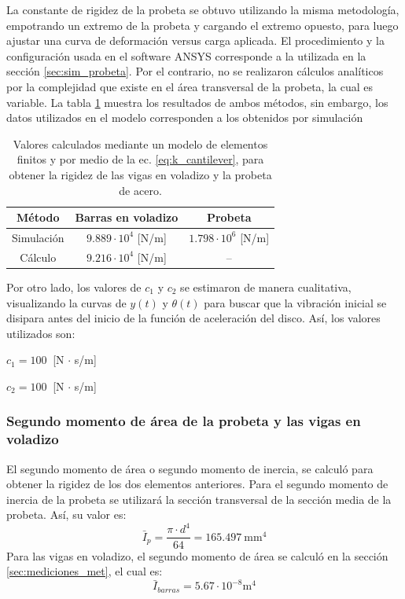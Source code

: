 La constante de rigidez de la probeta se obtuvo utilizando la misma metodología, empotrando un extremo de la probeta y cargando el extremo opuesto, para luego ajustar una curva de deformación versus carga aplicada. El procedimiento y la configuración usada en el software ANSYS corresponde a la utilizada en la sección \ref{sec:sim_probeta}.  Por el contrario, no se realizaron cálculos analíticos por la complejidad que existe en el área transversal de la probeta, la cual es variable. La tabla \ref{tab:k_valor} muestra los resultados de ambos métodos, sin embargo, los datos utilizados en el modelo corresponden a los obtenidos por simulación
\begin{table}[h]
\centering
\begin{tabular}{ccc}
\hline
Método & Barras en voladizo & Probeta \\ \hline
Simulación & $9.889\cdot 10^4$ [N/m] & $1.798\cdot 10^6$ [N/m] \\
Cálculo & $9.216\cdot 10^4$ [N/m] & -- \\ \hline
\end{tabular}
\caption{Valores calculados mediante un modelo de elementos finitos y por medio de la ec. \ref{eq:k_cantilever}, para obtener la rigidez de las vigas en voladizo y la probeta de acero.}
\label{tab:k_valor}
\end{table}

Por otro lado, los valores de $c_1$ y $c_2$ se estimaron de manera cualitativa, visualizando la curvas de $y(t)$ y $\theta(t)$ para buscar que la vibración inicial se disipara antes del inicio de la función de aceleración del disco. Así, los valores utilizados son:
\begin{itemize*}
	\item $c_1= 100\:$ [N $\cdot$ s/m]
	\item $c_2= 100\:$ [N $\cdot$ s/m] 
\end{itemize*}
\subsubsection{Segundo momento de área de la probeta y las vigas en voladizo}
El segundo momento de área o segundo momento de inercia, se calculó para obtener la rigidez de los dos elementos anteriores. Para el segundo momento de inercia de la probeta se utilizará la sección transversal de la sección media de la probeta. Así, su valor es:
\begin{equation}
	\bar{I}_p = \frac{\pi \cdot d^4}{64} = 165.497\: \text{mm}^4
\end{equation}
Para las vigas en voladizo, el segundo momento de área se calculó en la sección \ref{sec:mediciones_met}, el cual es:
\begin{equation}
	\bar{I}_{barras} = 5.67 \cdot 10^{-8} \text{m}^4
\end{equation}
